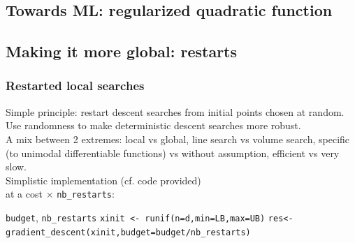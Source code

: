 \documentclass[12pt]{beamer}
\begin{document}
\subsection{Towards ML: regularized quadratic function}

\subsection{Making it more global: restarts}

\begin{frame}
\frametitle{Restarted local searches} 
Simple principle: restart descent searches from initial points chosen at random.\\
Use randomness to make deterministic descent searches more robust.\\
A mix between 2 extremes: local vs global, line search vs volume search, specific (to unimodal differentiable 
functions) vs without assumption, efficient vs very slow.\\
Simplistic implementation (cf. code provided) \\
\hspace{5cm} at a cost $\times$ \texttt{nb\_restarts}:
\vspace{-0.4cm}
\begin{center}
\begin{minipage}[t]{\textwidth}
\begin{algorithmic}
\REQUIRE \texttt{budget}, \texttt{nb\_restarts}
\STATE \texttt{xinit <- runif(n=d,min=LB,max=UB)}
\STATE \texttt{res<-gradient\_descent(xinit,budget=budget/nb\_restarts)}
\ENDFOR
\end{algorithmic}
\end{minipage}
\end{center}
\end{frame}
\end{document}
